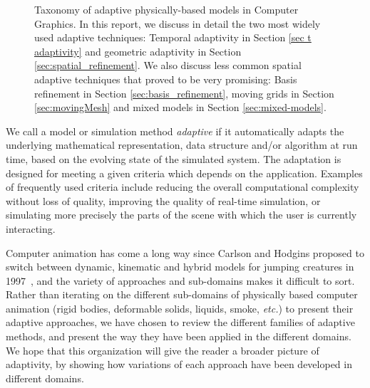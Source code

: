 \begin{figure}
{
    }
    \caption[STAR adaptivity: Taxonomy]{\label{fig:taxonomy}Taxonomy of adaptive physically-based models in Computer Graphics. In this report, we discuss in detail the two most widely used adaptive techniques: Temporal adaptivity in Section \ref{sec t adaptivity} and geometric adaptivity in Section \ref{sec:spatial_refinement}. We also discuss less common spatial adaptive techniques that proved to be very promising: Basis refinement in Section \ref{sec:basis_refinement}, moving grids in Section \ref{sec:movingMesh} and mixed models in Section \ref{sec:mixed-models}.}
\end{figure}

We call a model or simulation method \emph{adaptive} if it automatically adapts the underlying mathematical representation, data structure and/or algorithm at run time, based on the evolving state of the simulated system.
The adaptation is designed for meeting a given criteria which depends on the application. Examples of frequently used criteria include reducing the overall computational complexity without loss of quality, improving the quality of real-time simulation, or simulating more precisely the parts of the scene with which the user is currently interacting.

Computer animation has come a long way since Carlson and Hodgins proposed to switch between dynamic, kinematic and hybrid models for jumping creatures in 1997~\cite{Carlson1997}, and the variety of approaches and sub-domains makes it difficult to sort.
Rather than iterating on the different sub-domains of physically based computer animation (rigid bodies, deformable solids, liquids, smoke, \textit{etc.}) to present their adaptive approaches, we have chosen to review the different families of adaptive methods, and present the way they have been applied in the different domains.
We hope that this organization will give the reader a broader picture of adaptivity, by showing how variations of each approach have been developed in different domains.

